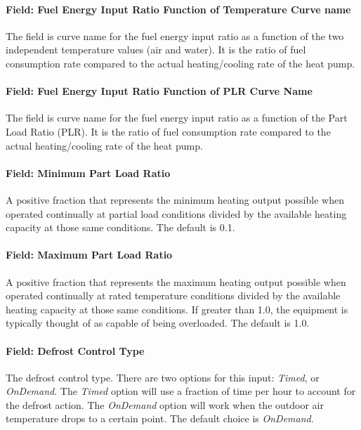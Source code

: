 \paragraph{Field: Fuel Energy Input Ratio Function of Temperature Curve name}

The field is curve name for the fuel energy input ratio as a function of the two independent temperature values (air and water). It is the ratio of fuel consumption rate compared to the actual heating/cooling rate of the heat pump.

\paragraph{Field: Fuel Energy Input Ratio Function of PLR Curve Name}

The field is curve name for the fuel energy input ratio as a function of the Part Load Ratio (PLR). It is the ratio of fuel consumption rate compared to the actual heating/cooling rate of the heat pump.

\paragraph{Field: Minimum Part Load Ratio}

A positive fraction that represents the minimum heating output possible when operated continually at partial load conditions divided by the available heating capacity at those same conditions. The default is 0.1.

\paragraph{Field: Maximum Part Load Ratio}

A positive fraction that represents the maximum heating output possible when operated continually at rated temperature conditions divided by the available heating capacity at those same conditions. If greater than 1.0, the equipment is typically thought of as capable of being overloaded. The default is 1.0.

\paragraph{Field: Defrost Control Type}

The defrost control type. There are two options for this input: \emph{Timed}, or \emph{OnDemand}. The \emph{Timed} option will use a fraction of time per hour to account for the defrost action. The \emph{OnDemand} option will work when the outdoor air temperature drops to a certain point. The default choice is \emph{OnDemand}.


